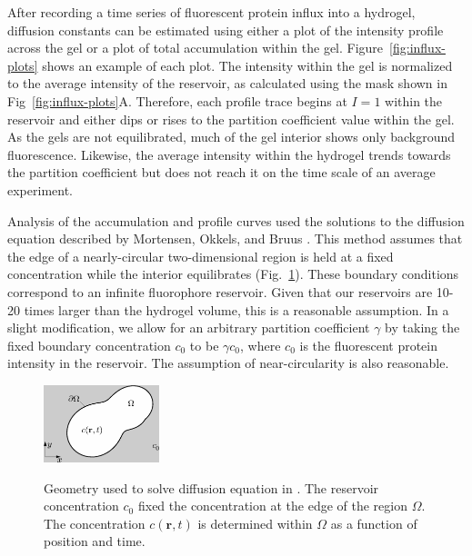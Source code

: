 After recording a time series of fluorescent protein influx into a hydrogel, diffusion constants can be estimated using either a plot of the intensity profile across the gel or a plot of total accumulation within the gel.  Figure~\ref{fig:influx-plots} shows an example of each plot.  The intensity within the gel is normalized to the average intensity of the reservoir, as calculated using the mask shown in Fig~\ref{fig:influx-plots}A.  Therefore, each profile trace begins at $I=1$ within the reservoir and either dips or rises to the partition coefficient value within the gel.  As the gels are not equilibrated, much of the gel interior shows only background fluorescence.  Likewise, the average intensity within the hydrogel trends towards the partition coefficient but does not reach it on the time scale of an average experiment.

Analysis of the accumulation and profile curves used the solutions to the diffusion equation described by Mortensen, Okkels, and Bruus \cite{mortensen06}.  This method assumes that the edge of  a nearly-circular two-dimensional region is held at a fixed concentration while the interior equilibrates (Fig.~\ref{fig:mortensen}).  These boundary conditions correspond to an infinite fluorophore reservoir.  Given that our reservoirs are 10-20 times larger than the hydrogel volume, this is a reasonable assumption.  In a slight modification, we allow for an arbitrary partition coefficient $\gamma$ by taking the fixed boundary concentration $c_0$ to be $\gamma c_0$, where $c_0$ is the fluorescent protein intensity in the reservoir.  The assumption of near-circularity is also reasonable.

\begin{figure}
\caption[Geometry of profile and accumulation model.]{Geometry used to solve diffusion equation in \cite{mortensen06}.  The reservoir concentration $c_0$ fixed the concentration at the edge of the region $\Omega$.  The concentration $c(\mathbf{r},t)$ is determined within $\Omega$ as a function of position and time.}
\centering
\includegraphics[width=0.3\textwidth]{figs/ch04/mortensen}
\label{fig:mortensen}
\end{figure}

